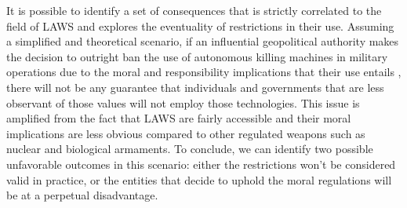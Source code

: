 It is possible to identify a set of consequences that is strictly correlated to the field of LAWS and explores the eventuality of restrictions in their use.
Assuming a simplified and theoretical scenario, if an influential geopolitical authority makes the decision to outright ban the use of autonomous killing machines in military operations due to the moral and responsibility implications that their use entails \parencite{SPAKR}, there will not be any guarantee that individuals and governments that are less observant of those values will not employ those technologies.
This issue is amplified from the fact that LAWS are fairly accessible and their moral implications are less obvious compared to other regulated weapons such as nuclear and biological armaments. 
To conclude, we can identify two possible unfavorable outcomes in this scenario: either the restrictions won't be considered valid in practice, or the entities that decide to uphold the moral regulations will be at a perpetual disadvantage.